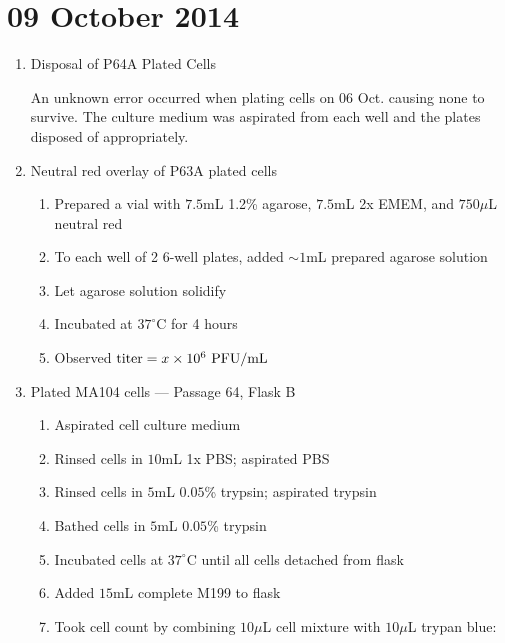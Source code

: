
% 
% 
% 

\section*{09 October 2014}

\begin{enumerate}
	\item Disposal of P64A Plated Cells
	
	An unknown error occurred when plating cells on 06 Oct. causing none to survive. The culture medium was aspirated from each well and the plates disposed of appropriately.
	
	\item Neutral red overlay of P63A plated cells
		\begin{enumerate}
			\item Prepared a vial with $7.5$mL 1.2\% agarose, $7.5$mL 2x EMEM, and $750\mu$L neutral red
			\item To each well of 2 6-well plates, added $\sim 1$mL prepared agarose solution
			\item Let agarose solution solidify
			\item Incubated at $37^{\circ}$C for 4 hours
			\item Observed $\text{titer}=x\times 10^{6}\text{ PFU/mL}$
		\end{enumerate}

	\item Plated MA104 cells --- Passage 64, Flask B
		\begin{enumerate}
			\item Aspirated cell culture medium
			\item Rinsed cells in $10$mL 1x PBS; aspirated PBS
			\item Rinsed cells in $5$mL $0.05$\% trypsin; aspirated trypsin
			\item Bathed cells in $5$mL $0.05$\% trypsin
			\item Incubated cells at $37^{\circ}$C until all cells detached from flask
			\item Added $15$mL complete M199 to flask\
			\item Took cell count by combining $10\mu$L cell mixture with $10\mu$L trypan blue:
			

\end{enumerate}
\end{enumerate}
